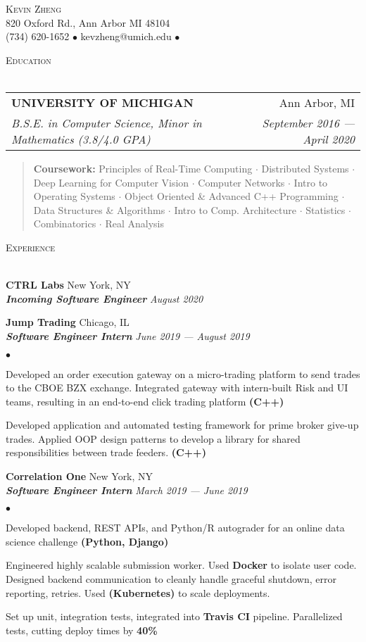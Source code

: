 \documentclass[10pt]{article}
\makeatletter
\newcommand{\area}[2]{\vspace*{-9pt} \begin{verse}\textbf{#1}   #2 \end{verse}  }
\newcommand{\lineunder}{\vspace*{-8pt} \\ \hspace*{-18pt} \hrulefill \\}
\newcommand{\header}[1]{{\hspace*{-15pt}\vspace*{6pt} \Large\textsc{#1}} \vspace*{-6pt} \lineunder \vspace{4pt}}
\newcommand{\employer}[4]{{ \normalsize\textbf{#1} \small\hfill{#2}\\ {\small\textbf{\emph{#3}}} \small\hfill\textit{#4}\\  }}
\newcommand{\contact}[3]{
	\vspace*{-4pt}
	\begin{center}
		{\huge \scshape {#1}}\\
		\vspace{6pt}
		#2\\
		#3
	\end{center}
	\vspace*{-10pt}
	}
\newenvironment{achievements}{\begin{list}{$\bullet$}{\topsep 0pt \itemsep -2pt}}{\vspace*{6pt}\end{list}}
\newcommand{\school}[4]{
	\begin{tabular*}{6.55in}{l@{\extracolsep{\fill}}r}
		\uppercase{\normalsize\textbf{#1}} & #2 \\
		\textit{#3} & \textit{#4}\\
	\end{tabular*}\vspace*{1pt}}
\newcommand{\click}[2]{\href{http://#1}{\colorlet{temp}{.}\color{blue}{
	\underline{\color{temp}#2}}\color{temp}}}
\makeatother
\begin{document}
\small
\smallskip
\vspace*{-46pt}

\contact{Kevin Zheng}
{\small 820 Oxford Rd., Ann Arbor MI 48104}
{\small(734) 620-1652 $\bullet$ kevzheng@umich.edu  $\bullet$ \click{kevzheng.com}{kevzheng.com}}

\vspace{5pt}

\header{Education}
\vspace{1ex}
\school{University of Michigan}{Ann Arbor, MI}{B.S.E. in Computer Science, Minor in Mathematics (3.8/4.0 GPA)}{September 2016 --- April 2020}

\vspace{8pt}

\area{Coursework:}{Principles of Real-Time Computing $\cdot$ Distributed Systems $\cdot$ Deep Learning for Computer Vision $\cdot$ Computer Networks $\cdot$ Intro to Operating Systems $\cdot$ Object Oriented \& Advanced C++ Programming $\cdot$ Data Structures \& Algorithms $\cdot$ Intro to Comp. Architecture $\cdot$ Statistics $\cdot$ Combinatorics $\cdot$ Real Analysis}

\vspace{5pt}

\header{Experience}

\vspace{4pt}

\employer{CTRL Labs}{New York, NY}{Incoming Software Engineer}{August 2020}

\vspace{10pt}

\employer{Jump Trading}{Chicago, IL}{Software Engineer Intern}{June 2019 --- August 2019}
\begin{achievements}
	\item Developed an order execution gateway on a micro-trading platform to send trades to the CBOE BZX exchange. Integrated gateway with intern-built Risk and UI teams, resulting in an end-to-end click trading platform \textbf{(C++)}
	\item Developed application and automated testing framework for prime broker give-up trades. Applied OOP design patterns to develop a library for shared responsibilities between trade feeders. \textbf{(C++)}
\end{achievements}


\vspace{4pt}

\employer{Correlation One}{New York, NY}{Software Engineer Intern}{March 2019 --- June 2019}
\begin{achievements}
	\item Developed backend, REST APIs, and Python/R autograder for an online data science challenge \textbf{(Python, Django)}
	\item Engineered highly scalable submission worker. Used \textbf{Docker} to isolate user code. Designed backend communication to cleanly handle graceful shutdown, error reporting, retries. Used \textbf{(Kubernetes)} to scale deployments.
	\item Set up unit, integration tests, integrated into \textbf{Travis CI} pipeline. Parallelized tests, cutting deploy times by \textbf{40\%}
\end{achievements}
\end{document}
